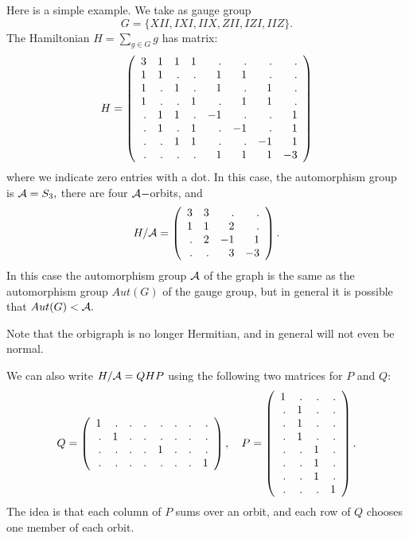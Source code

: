 Here is a simple example. %
We take as gauge group 
$$G = \{XII, IXI, IIX, ZII, IZI, IIZ\}.$$
The Hamiltonian $H = \sum_{g\in G} g$ has matrix:
$$
H = \left(\begin{array}{rrrrrrrr}
 3 &  1 &  1 &  1 &  . &  . &  . &  . \cr
  1 &  1 &  . &  . &  1 &  1 &  . &  . \cr
  1 &  . &  1 &  . &  1 &  . &  1 &  . \cr
  1 &  . &  . &  1 &  . &  1 &  1 &  . \cr
  . &  1 &  1 &  . & -1 &  . &  . &  1 \cr
  . &  1 &  . &  1 &  . & -1 &  . &  1 \cr
  . &  . &  1 &  1 &  . &  . & -1 &  1 \cr
  . &  . &  . &  . &  1 &  1 &  1 & -3
\end{array}\right)
$$
where we indicate zero entries with a dot.
In this case, the automorphism group is $\mathcal{A}=S_3,$
there are four $\mathcal{A}-$orbits, and
$$
H/\mathcal{A} = \left(\begin{array}{rrrr}
 3 &  3 &  . &  . \cr
  1 &  1 &  2 &  . \cr
  . &  2 & -1 &  1 \cr
  . &  . &  3 & -3
\end{array}\right).
$$
In this case the automorphism group $\mathcal{A}$ of the graph
is the same as the automorphism group $Aut(G)$ of the gauge group,
but in general it is possible that $Aut(G) < \mathcal{A}.$

Note that the orbigraph is no longer Hermitian,
and in general will not even be normal.

We can also write $H/\mathcal{A} = QHP$ using the following two matrices for $P$ and $Q:$
$$
Q = 
\left(\begin{array}{rrrrrrrr}
 1 &  . &  . &  . &  . &  . &  . &  . \cr
  . &  1 &  . &  . &  . &  . &  . &  . \cr
  . &  . &  . &  . &  1 &  . &  . &  . \cr
  . &  . &  . &  . &  . &  . &  . &  1
\end{array}\right),\ \ \ 
P = 
\left(\begin{array}{rrrr}
 1 &  . &  . &  . \cr
  . &  1 &  . &  . \cr
  . &  1 &  . &  . \cr
  . &  1 &  . &  . \cr
  . &  . &  1 &  . \cr
  . &  . &  1 &  . \cr
  . &  . &  1 &  . \cr
  . &  . &  . &  1
\end{array}\right).
$$
The idea is that each column of $P$ sums over an orbit,
and each row of $Q$ chooses one member of each orbit.


